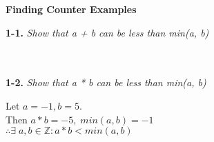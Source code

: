 \textbf{Finding Counter Examples}

\begin{minipage}{0.95\textwidth}
\begin{flushleft}
\textbf{1-1.} \emph{Show that a + b can be less than min(a, b)} \\
  \textcolor{answer}{
	   \\ 
	   \\
  }
\end{flushleft}
\end{minipage}
  

\textbf{1-2.} \emph{Show that a * b can be less than min(a, b)}
  \begin{center}
  \textcolor{answer}{
	  Let $a = -1, b = 5$. \\
	  Then $a*b = -5, \; min(a,b) = -1$\\
	  $\therefore \exists \; a, b \in \mathbb{Z} : a*b < min(a,b)$
  }
  \end{center}





